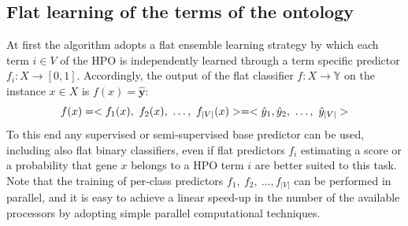 \documentclass{bioinfo}
\newcommand{\by}{\boldsymbol{y}}
\begin{document}
\begin{methods}
\subsection{Flat learning of the terms of the ontology}
At first the algorithm adopts  a flat ensemble learning strategy by which each term $i \in V$ of the HPO is independently learned through a term specific predictor $f_i : X \rightarrow [0,1]$. 
Accordingly, the output of the flat classifier $f:X \rightarrow  \mathbb{Y}$ on the instance $x \in X$ is $f(x) = \hat{\by}$:
\vspace*{-10pt}
\begin{equation}
f(x) = <f_1(x),\ f_2(x),\ \ldots,\ f_{|V|}(x)> =  <\hat{y}_1,\hat{y}_2,\ \ldots,\ \hat{y}_{|V|}> 
\vspace*{-5pt}
\end{equation}
To this end any supervised or semi-supervised base predictor can be used, including also flat  binary classifiers, even if flat predictors $f_i$ estimating a score or a probability that gene $x$ belongs to a HPO term $i$  are better suited to this task.
Note that the training of per-class predictors $f_1,\ f_2,\ \ldots, f_{|V|}$ can be performed in parallel, and it is easy to achieve a linear speed-up in the number of the available processors by adopting simple parallel computational techniques. 


\end{methods}
\end{document}
